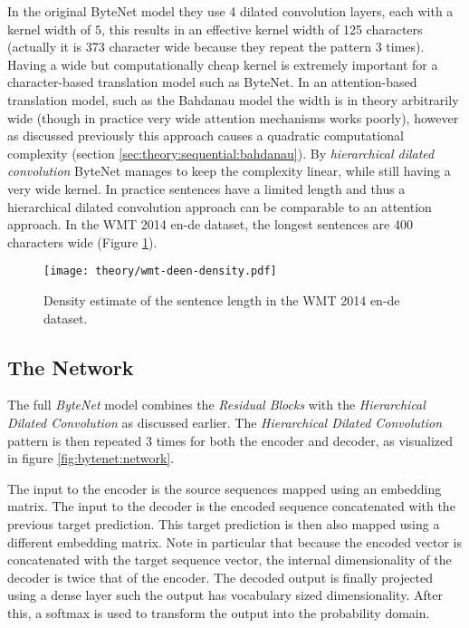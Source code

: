 In the original ByteNet model they use 4 dilated convolution layers, each with a kernel width of $5$, this results in an effective kernel width of 125 characters (actually it is 373 character wide because they repeat the pattern 3 times). Having a wide but computationally cheap kernel is extremely important for a character-based translation model such as ByteNet. In an attention-based translation model, such as the Bahdanau model \cite{bahdanau-nmt} the width is in theory arbitrarily wide (though in practice very wide attention mechanisms works poorly), however as discussed previously this approach causes a quadratic computational complexity (section \ref{sec:theory:sequential:bahdanau}). By \textit{hierarchical dilated convolution} ByteNet manages to keep the complexity linear, while still having a very wide kernel. In practice sentences have a limited length and thus a hierarchical dilated convolution approach can be comparable to an attention approach. In the WMT 2014 en-de dataset, the longest sentences are 400 characters wide (Figure \ref{fig:bytenet:wmt-deen-density}).

\begin{figure}[h]
    \centering
    \texttt{[image: theory/wmt-deen-density.pdf]}
    \caption{Density estimate of the sentence length in the WMT 2014 en-de dataset.}
    \label{fig:bytenet:wmt-deen-density}
\end{figure}

\subsection{The Network}

The full \textit{ByteNet} model combines the \textit{Residual Blocks} with the \textit{Hierarchical Dilated Convolution} as discussed earlier. The \textit{Hierarchical Dilated Convolution} pattern is then repeated 3 times for both the encoder and decoder, as visualized in figure \ref{fig:bytenet:network}.

The input to the encoder is the source sequences mapped using an embedding matrix. The input to the decoder is the encoded sequence concatenated with the previous target prediction. This target prediction is then also mapped using a different embedding matrix. Note in particular that because the encoded vector is concatenated with the target sequence vector, the internal dimensionality of the decoder is twice that of the encoder. The decoded output is finally projected using a dense layer such the output has vocabulary sized dimensionality. After this, a softmax is used to transform the output into the probability domain.

